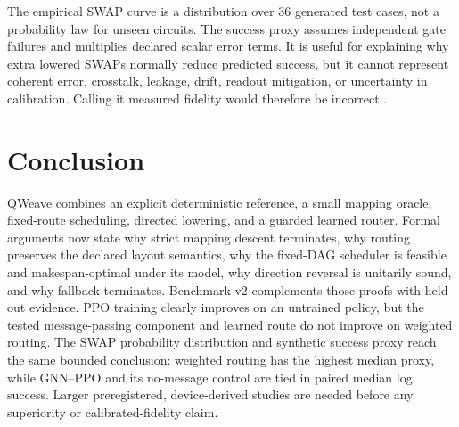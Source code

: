 \documentclass[conference]{IEEEtran}
\begin{document}
The empirical SWAP curve is a distribution over 36 generated test cases, not a
probability law for unseen circuits. The success proxy assumes independent
gate failures and multiplies declared scalar error terms. It is useful for
explaining why extra lowered SWAPs normally reduce predicted success, but it
cannot represent coherent error, crosstalk, leakage, drift, readout mitigation,
or uncertainty in calibration. Calling it measured fidelity would therefore
be incorrect \cite{wallman2016randomized,hashim2021randomized,
resch2022benchmarking}.

\section{Conclusion}
QWeave combines an explicit deterministic reference, a small mapping oracle,
fixed-route scheduling, directed lowering, and a guarded learned router.
Formal arguments now state why strict mapping descent terminates, why routing
preserves the declared layout semantics, why the fixed-DAG scheduler is
feasible and makespan-optimal under its model, why direction reversal is
unitarily sound, and why fallback terminates. Benchmark v2 complements those
proofs with held-out evidence. PPO training clearly improves on an untrained
policy, but the tested message-passing component and learned route do not
improve on weighted routing. The SWAP probability distribution and synthetic
success proxy reach the same bounded conclusion: weighted routing has the
highest median proxy, while GNN--PPO and its no-message control are tied in
paired median log success. Larger preregistered, device-derived studies are
needed before any superiority or calibrated-fidelity claim.
\end{document}
